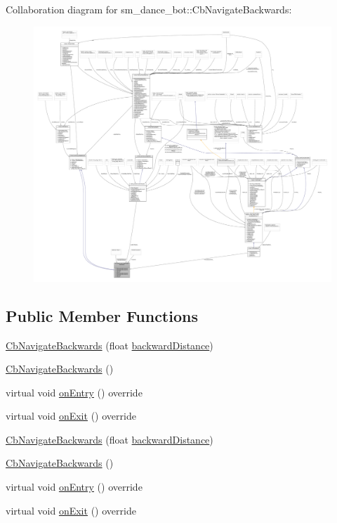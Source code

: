 Collaboration diagram for sm\+\_\+dance\+\_\+bot\+:\+:Cb\+Navigate\+Backwards\+:
\nopagebreak
\begin{figure}[H]
\begin{center}
\leavevmode
\includegraphics[width=350pt]{classsm__dance__bot_1_1CbNavigateBackwards__coll__graph}
\end{center}
\end{figure}
\subsection*{Public Member Functions}
\begin{DoxyCompactItemize}
\item 
\hyperlink{classsm__dance__bot_1_1CbNavigateBackwards_aa5bcc8ba901c4464370399158d5818b6}{Cb\+Navigate\+Backwards} (float \hyperlink{classsm__dance__bot_1_1CbNavigateBackwards_ace20c1dfa7b8e84c754aedbd3dd00fdf}{backward\+Distance})
\item 
\hyperlink{classsm__dance__bot_1_1CbNavigateBackwards_ac2a9b5ab4d13f2af824511c9385c2d6d}{Cb\+Navigate\+Backwards} ()
\item 
virtual void \hyperlink{classsm__dance__bot_1_1CbNavigateBackwards_a5d7816a541c5f7121c9909d5b43a81c8}{on\+Entry} () override
\item 
virtual void \hyperlink{classsm__dance__bot_1_1CbNavigateBackwards_ac85cc397d597120fc8906b98d4241fe8}{on\+Exit} () override
\item 
\hyperlink{classsm__dance__bot_1_1CbNavigateBackwards_aa5bcc8ba901c4464370399158d5818b6}{Cb\+Navigate\+Backwards} (float \hyperlink{classsm__dance__bot_1_1CbNavigateBackwards_ace20c1dfa7b8e84c754aedbd3dd00fdf}{backward\+Distance})
\item 
\hyperlink{classsm__dance__bot_1_1CbNavigateBackwards_ac2a9b5ab4d13f2af824511c9385c2d6d}{Cb\+Navigate\+Backwards} ()
\item 
virtual void \hyperlink{classsm__dance__bot_1_1CbNavigateBackwards_a5d7816a541c5f7121c9909d5b43a81c8}{on\+Entry} () override
\item 
virtual void \hyperlink{classsm__dance__bot_1_1CbNavigateBackwards_ac85cc397d597120fc8906b98d4241fe8}{on\+Exit} () override
\end{DoxyCompactItemize}
